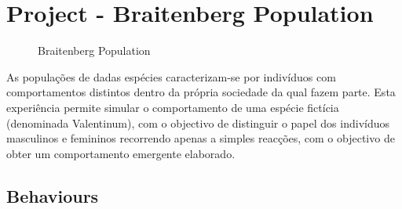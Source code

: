 \documentclass[a4paper]{article}
\begin{document}
\cleardoublepage
\section{Project - Braitenberg Population}
\begin{figure}[h]
	\centering
	\hspace{5px}
	\hspace{5px}

	\caption{Braitenberg Population}
\end{figure}

As populações de dadas espécies caracterizam-se por indivíduos com comportamentos distintos dentro da própria sociedade da qual fazem parte.
Esta experiência permite simular o comportamento de uma espécie fictícia (denominada Valentinum), com o objectivo de distinguir o papel dos indivíduos masculinos e femininos recorrendo apenas a simples reacções, com o objectivo de obter um comportamento emergente elaborado.

\subsection{Behaviours}
\end{document}
